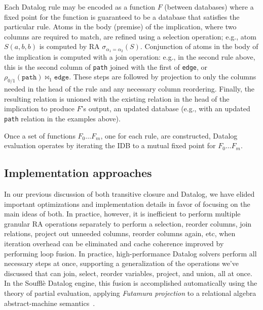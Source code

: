 Each Datalog rule may be encoded as a function $F$ (between databases) where a fixed point for the function is guaranteed to be a database that satisfies the particular rule. Atoms in the body (premise) of the implication, where two columns are required to match, are refined using a selection operation; e.g., atom $S(a,b,b)$ is computed by RA $\sigma_{\alpha_1 = \alpha_2}(S)$. Conjunction of atoms in the body of the implication is computed with a join operation: e.g., in the second rule above, this is the second column of \texttt{path} joined with the first of \texttt{edge}, or $\rho_{0 / 1}(\texttt{path}) \bowtie_1 \texttt{edge}$. These steps are followed by projection to only the columns needed in the head of the rule and any necessary column reordering. Finally, the resulting relation is unioned with the existing relation in the head of the implication to produce $F$'s output, an updated database (e.g., with an updated \texttt{path} relation in the examples above).

Once a set of functions $F_0 \ldots F_m$, one for each rule, are constructed, Datalog evaluation operates by iterating the IDB to a mutual fixed point for $F_0 \ldots F_m$.


\subsection{Implementation approaches}

In our previous discussion of both transitive closure and Datalog, we have elided important optimizations and implementation details in favor of focusing on the main ideas of both. In practice, however, it is inefficient to perform multiple granular RA operations separately to perform a selection, reorder columns, join relations, project out unneeded columns, reorder columns again, etc, when iteration overhead can be eliminated and cache coherence improved by performing loop fusion. In practice, high-performance Datalog solvers perform all necessary steps at once, supporting a generalization of the operations we've discussed that can join, select, reorder variables, project, and union, all at once. In the Souffl\`e Datalog engine, this fusion is accomplished automatically using the theory of partial evaluation, applying \emph{Futamura projection} to a relational algebra abstract-machine semantics~\cite{Scholz:2016:FLP:2892208.2892226}. 

